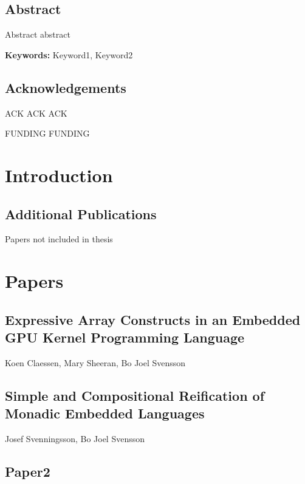 \documentclass[a4paper]{book}
\begin{document}
%

\clearpage

\section*{Abstract}
Abstract abstract 

\vspace{5mm}

\noindent

\textbf{Keywords:} Keyword1, Keyword2  

\clearpage

\section*{Acknowledgements}
ACK ACK ACK 

\vspace{5mm}

FUNDING FUNDING 


\tableofcontents


\newpage


\chapter{Introduction}


\clearpage{}
\section*{Additional Publications}

Papers not included in thesis







\chapter{Papers}

\cleardoublepage 

\section*{\centering Expressive Array Constructs in an Embedded GPU Kernel Programming Language}

\begin{center} 
Koen Claessen, Mary Sheeran, Bo Joel Svensson
\end{center}



\cleardoublepage 

\section*{\centering Simple and Compositional Reification of Monadic Embedded Languages}

\begin{center} 
Josef Svenningsson, Bo Joel Svensson
\end{center}




\cleardoublepage 

\section{Paper2}

%

\cleardoublepage
\end{document}
